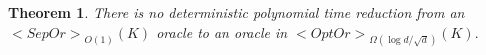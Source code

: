 \documentclass[11pt,letterpaper]{article}
\def\mathsf#1{<#1>}%
\def\xspace{}%
\newtheorem{theorem}{Theorem}[section]
\theoremstyle{definition}
\theoremstyle{remark}
\newcommand{\sht}{{\mathsf {SHT}}\xspace}
\newcommand{\sep}{{\mathsf{SepOr}}}
\newcommand{\opto}{{\mathsf{OptOr}}}
\begin{document}
\begin{theorem}\label{thm-sep-opt-lower}
There is no deterministic polynomial time reduction from an  $\sep_{O(1)}(K)$ oracle to an oracle in $\opto_{\Omega(\log d/\sqrt{d})}(K).$ 
\end{theorem}



\end{document}
